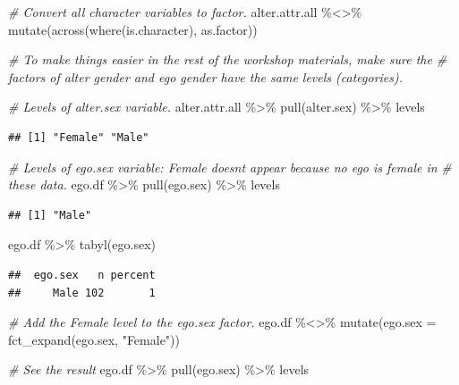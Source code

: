 \documentclass[
]{book}
\newenvironment{Shaded}{\begin{snugshade}}{\end{snugshade}}
\newcommand{\AttributeTok}[1]{\textcolor[rgb]{0.77,0.63,0.00}{#1}}
\newcommand{\CommentTok}[1]{\textcolor[rgb]{0.56,0.35,0.01}{\textit{#1}}}
\newcommand{\FunctionTok}[1]{\textcolor[rgb]{0.00,0.00,0.00}{#1}}
\newcommand{\NormalTok}[1]{#1}
\newcommand{\SpecialCharTok}[1]{\textcolor[rgb]{0.00,0.00,0.00}{#1}}
\newcommand{\StringTok}[1]{\textcolor[rgb]{0.31,0.60,0.02}{#1}}
\begin{document}
\begin{Shaded}
\begin{Highlighting}[]
\CommentTok{\# Convert all character variables to factor.}
\NormalTok{alter.attr.all }\SpecialCharTok{\%\textless{}\textgreater{}\%} 
  \FunctionTok{mutate}\NormalTok{(}\FunctionTok{across}\NormalTok{(}\FunctionTok{where}\NormalTok{(is.character), as.factor))}

\CommentTok{\# To make things easier in the rest of the workshop materials, make sure the }
\CommentTok{\# factors of alter gender and ego gender have the same levels (categories).}

\CommentTok{\# Levels of alter.sex variable.}
\NormalTok{alter.attr.all }\SpecialCharTok{\%\textgreater{}\%}
  \FunctionTok{pull}\NormalTok{(alter.sex) }\SpecialCharTok{\%\textgreater{}\%}
\NormalTok{  levels}
\end{Highlighting}
\end{Shaded}

\begin{verbatim}
## [1] "Female" "Male"
\end{verbatim}

\begin{Shaded}
\begin{Highlighting}[]
\CommentTok{\# Levels of ego.sex variable: Female doesn\textquotesingle{}t appear because no ego is female in }
\CommentTok{\# these data.}
\NormalTok{ego.df }\SpecialCharTok{\%\textgreater{}\%}
  \FunctionTok{pull}\NormalTok{(ego.sex) }\SpecialCharTok{\%\textgreater{}\%}
\NormalTok{  levels}
\end{Highlighting}
\end{Shaded}

\begin{verbatim}
## [1] "Male"
\end{verbatim}

\begin{Shaded}
\begin{Highlighting}[]
\NormalTok{ego.df }\SpecialCharTok{\%\textgreater{}\%}
  \FunctionTok{tabyl}\NormalTok{(ego.sex)}
\end{Highlighting}
\end{Shaded}

\begin{verbatim}
##  ego.sex   n percent
##     Male 102       1
\end{verbatim}

\begin{Shaded}
\begin{Highlighting}[]
\CommentTok{\# Add the Female level to the ego.sex factor.}
\NormalTok{ego.df }\SpecialCharTok{\%\textless{}\textgreater{}\%} 
  \FunctionTok{mutate}\NormalTok{(}\AttributeTok{ego.sex =} \FunctionTok{fct\_expand}\NormalTok{(ego.sex, }\StringTok{"Female"}\NormalTok{))}

\CommentTok{\# See the result}
\NormalTok{ego.df }\SpecialCharTok{\%\textgreater{}\%}
  \FunctionTok{pull}\NormalTok{(ego.sex) }\SpecialCharTok{\%\textgreater{}\%}
\NormalTok{  levels}
\end{Highlighting}
\end{Shaded}
\end{document}

